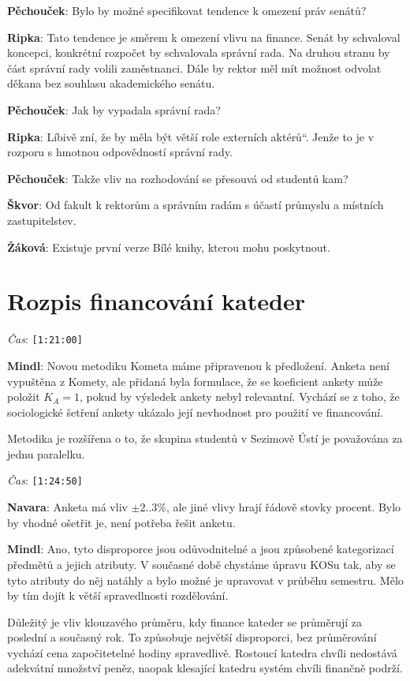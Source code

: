 \documentclass[a4paper,10pt,notitlepage]{article}
\newcommand{\ts}[1]{\texttt{[#1]}}
\newcommand{\tsp}[1]{\noindent \textit{Čas}: \ts{#1}}
\newcommand{\cl}[1]{\noindent \textbf{#1}:}
\newcommand\uv[1]{\quotedblbase #1\textquotedblleft}%
\begin{document}
\cl{Pěchouček} Bylo by možné specifikovat tendence k omezení práv senátů?

\cl{Ripka} Tato tendence je směrem k omezení vlivu na finance. Senát by schvaloval koncepci, konkrétní rozpočet by schvalovala správní rada. Na druhou stranu by část správní rady volili zaměstnanci. Dále by rektor měl mít možnost odvolat děkana bez souhlasu akademického senátu.

\cl{Pěchouček} Jak by vypadala správní rada?

\cl{Ripka} Líbivě zní, že by měla být větší role \uv{externích aktérů}. Jenže to je v rozporu s hmotnou odpovědností správní rady.

\cl{Pěchouček} Takže vliv na rozhodování se přesouvá od studentů kam?

\cl{Škvor} Od fakult k rektorům a správním radám s účastí průmyslu a místních zastupitelstev.

\cl{Žáková} Existuje první verze Bílé knihy, kterou mohu poskytnout.

\section{Rozpis financování kateder}

\tsp{1:21:00}

\cl{Mindl} Novou metodiku Kometa máme připravenou k předložení. Anketa není vypuštěna z Komety, ale přidaná byla formulace, že se koeficient ankety může položit $K_A = 1$, pokud by výsledek ankety nebyl relevantní. Vychází se z toho, že sociologické šetření ankety ukázalo její nevhodnost pro použití ve financování.

Metodika je rozšířena o to, že skupina studentů v Sezimově Ústí je považována za jednu paralelku.

\tsp{1:24:50}

\cl{Navara} Anketa má vliv $\pm 2..3\%$, ale jiné vlivy hrají řádově stovky procent. Bylo by vhodné ošetřit je, není potřeba řešit anketu.

\cl{Mindl} Ano, tyto disproporce jsou odůvodnitelné a jsou způsobené kategorizací předmětů a jejich atributy. V současné době chystáme úpravu KOSu tak, aby se tyto atributy do něj natáhly a bylo možné je upravovat v průběhu semestru. Mělo by tím dojít k větší spravedlnosti rozdělování.

Důležitý je vliv klouzavého průměru, kdy finance kateder se průměrují za poslední a současný rok. To způsobuje největší disproporci, bez průměrování vychází cena započitetelné hodiny spravedlivě. Rostoucí katedra chvíli nedostává adekvátní množství peněz, naopak klesající katedru systém chvíli finančně podrží.
\end{document}
